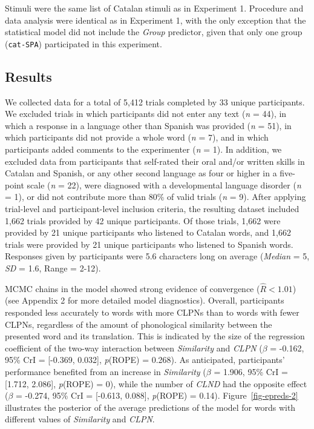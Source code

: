 \documentclass[
]{article}
\begin{document}
Stimuli were the same list of Catalan stimuli as in Experiment 1.
Procedure and data analysis were identical as in Experiment 1, with the
only exception that the statistical model did not include the
\emph{Group} predictor, given that only one group (\texttt{cat-SPA})
participated in this experiment.

\subsection{Results}\label{results-1}

We collected data for a total of 5,412 trials completed by 33 unique
participants. We excluded trials in which participants did not enter any
text (\emph{n} = 44), in which a response in a language other than
Spanish was provided (\emph{n} = 51), in which participants did not
provide a whole word (\emph{n} = 7), and in which participants added
comments to the experimenter (\emph{n} = 1). In addition, we excluded
data from participants that self-rated their oral and/or written skills
in Catalan and Spanish, or any other second language as four or higher
in a five-point scale (\emph{n} = 22), were diagnosed with a
developmental language disorder (\emph{n} = 1), or did not contribute
more than 80\% of valid trials (\emph{n} = 9). After applying
trial-level and participant-level inclusion criteria, the resulting
dataset included 1,662 trials provided by 42 unique participants. Of
those trials, 1,662 were provided by 21 unique participants who listened
to Catalan words, and 1,662 trials were provided by 21 unique
participants who listened to Spanish words. Responses given by
participants were 5.6 characters long on average (\emph{Median} = 5,
\emph{SD} = 1.6, Range = 2-12).

MCMC chains in the model showed strong evidence of convergence
(\(\hat{R}<1.01\)) (see Appendix 2 for more detailed model diagnostics).
Overall, participants responded less accurately to words with more CLPNs
than to words with fewer CLPNs, regardless of the amount of phonological
similarity between the presented word and its translation. This is
indicated by the size of the regression coefficient of the two-way
interaction between \emph{Similarity} and \emph{CLPN} (\(\beta\) =
-0.162, 95\% CrI = {[}-0.369, 0.032{]}, \emph{p}(ROPE) = 0.268). As
anticipated, participants' performance benefited from an increase in
\emph{Similarity} (\(\beta\) = 1.906, 95\% CrI = {[}1.712, 2.086{]},
\emph{p}(ROPE) = 0), while the number of \emph{CLND} had the opposite
effect (\(\beta\) = -0.274, 95\% CrI = {[}-0.613, 0.088{]},
\emph{p}(ROPE) = 0.14). Figure~\ref{fig-epreds-2} illustrates the
posterior of the average predictions of the model for words with
different values of \emph{Similarity} and \emph{CLPN}.
\end{document}
